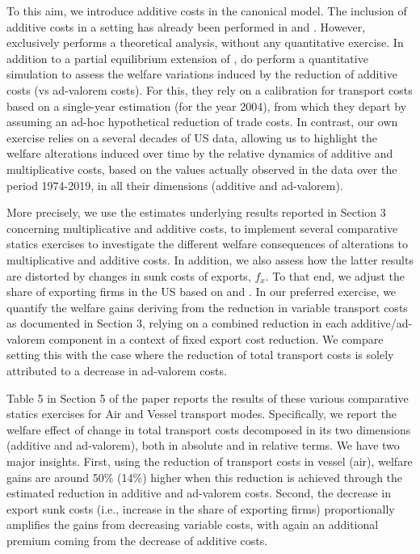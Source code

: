 \documentclass[a4paper,11pt]{article}
\begin{document}
To this aim, we introduce additive costs in the canonical \citet{melitz} model. The inclusion of additive costs in a \citet{melitz} setting has already been performed in \citet{sorensen2014} and \citet{Irrazabal_2015}. However, \citet{sorensen2014} exclusively performs a theoretical analysis, without any quantitative exercise. In addition to a partial equilibrium extension of \citet{melitz}, \citet{Irrazabal_2015} do perform a quantitative simulation to assess the welfare variations induced by the reduction of additive costs (vs ad-valorem costs). For this, they rely on a calibration for transport costs based on a single-year estimation (for the year 2004), from which they depart by assuming an ad-hoc hypothetical reduction of trade costs. In contrast, our own exercise relies on a several decades of US data, allowing us to highlight the welfare alterations induced over time by the relative dynamics of additive and multiplicative costs, based on the values actually observed in the data over the period 1974-2019, in all their dimensions (additive and ad-valorem).\smallskip

More precisely, we use the estimates underlying results reported in Section 3 concerning multiplicative and additive costs, to implement several comparative statics exercises to investigate the different welfare consequences of alterations to multiplicative and additive costs. In addition, we also assess how the latter results are distorted by changes in sunk costs of exports, $f_{x}$. To that end, we adjust the share of exporting firms in the US based on \citet{BEJK-AER-03} and \citet{Lincoln_McCallum2018}. In our preferred exercise, we quantify the welfare gains deriving from the reduction in variable transport costs as documented in Section 3, relying on a combined reduction in each additive/ad-valorem component in a context of fixed export cost reduction. We compare setting this with the case where the reduction of total transport costs  is solely attributed to a decrease in ad-valorem costs.

Table 5 in Section 5 of the paper reports the results of these various comparative statics exercises for Air and Vessel transport modes. Specifically, we report the welfare effect of change in total transport costs decomposed in its two dimensions (additive and ad-valorem), both in absolute and in relative terms. We have two major insights. First, using the reduction of transport costs in vessel (air),  welfare gains are around 50\% (14\%) higher when this reduction is achieved through the estimated reduction in additive and ad-valorem costs. Second, the decrease in export sunk costs (i.e., increase in the share of exporting firms) proportionally amplifies the gains from decreasing variable costs, with again an additional premium coming from the decrease of additive costs.
\end{document}
